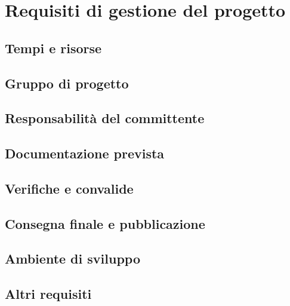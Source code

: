\chapter{Requisiti di gestione del progetto}
\section{Tempi e risorse}
\section{Gruppo di progetto}
\section{Responsabilità del committente}
\section{Documentazione prevista}
\section{Verifiche e convalide}
\section{Consegna finale e pubblicazione}
\section{Ambiente di sviluppo}
\section{Altri requisiti}
